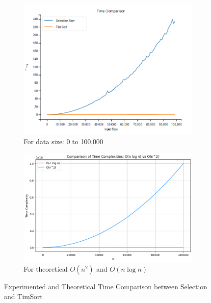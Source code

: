 \documentclass[article,10pt]{article}
\begin{document}
\begin{multicols}{2}
\begin{figure}[t!]
\begin{subfigure}{0.4\textwidth}
		\includegraphics[scale=0.25]{Images/100k_time_comp.png}
		\caption{For data size: 0 to 100,000}
		\label{d100k}
	\end{subfigure}
\hfill
        \begin{subfigure}{0.4\textwidth}
		\includegraphics[scale=0.25]{Images/actual_Function.png}
		\caption{For theoretical \(O(n^2)\) and \(O(n \log n)\) }
		\label{fig:theoretical_complexities}
	\end{subfigure}
 
	\caption{Experimented and Theoretical Time Comparison between Selection and TimSort}
 
\end{figure}


\end{multicols}
\end{document}
